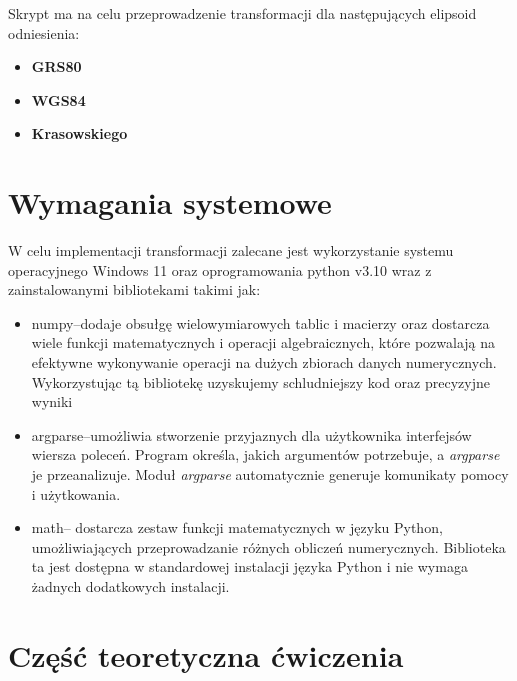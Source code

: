 \documentclass[a4paper,titleauthor]{mwart}
\begin{document}
\vspace{0.5cm}
Skrypt ma na celu przeprowadzenie transformacji dla następujących elipsoid odniesienia:
\begin{itemize}
    \item \textbf{GRS80}
    \item \textbf{WGS84}
    \item \textbf{Krasowskiego}
\end{itemize}
\section{Wymagania systemowe}
W celu implementacji transformacji zalecane jest wykorzystanie systemu operacyjnego Windows 11 oraz oprogramowania python v3.10 wraz z zainstalowanymi bibliotekami takimi jak:
\begin{itemize}
    \item numpy--dodaje obsułgę wielowymiarowych tablic i macierzy oraz dostarcza wiele funkcji matematycznych i operacji algebraicznych, które pozwalają na efektywne wykonywanie operacji na dużych zbiorach danych numerycznych. Wykorzystując tą bibliotekę uzyskujemy schludniejszy kod oraz precyzyjne wyniki
    \begin{flushright}
        \cite{numpy}
    \end{flushright}
    \item argparse--umożliwia stworzenie przyjaznych dla użytkownika interfejsów wiersza poleceń. Program określa, jakich argumentów potrzebuje, a \textit{argparse} je przeanalizuje. Moduł \textit{argparse} automatycznie generuje komunikaty pomocy i użytkowania.
    \begin{flushright}
        \cite{argparse}
    \end{flushright}
    \item math-- dostarcza zestaw funkcji matematycznych w języku Python, umożliwiających przeprowadzanie różnych obliczeń numerycznych. Biblioteka ta jest dostępna w standardowej instalacji języka Python i nie wymaga żadnych dodatkowych instalacji.
    \begin{flushright}
        \cite{math}
    \end{flushright}
\end{itemize}

\section{Część teoretyczna ćwiczenia}
\end{document}
